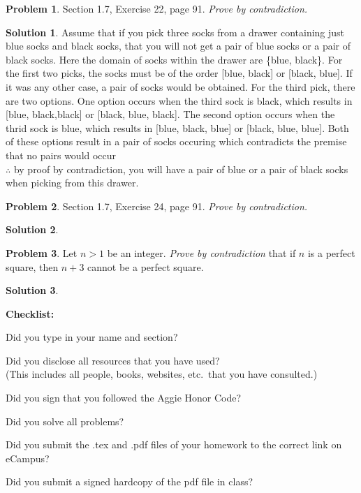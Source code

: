 \documentclass{article}
\theoremstyle{definition}
\newtheorem{problem}{Problem}
\newtheorem*{solution}{Solution}
\newcommand{\checklist}{\noindent\textbf{Checklist:}
\begin{compactitem}[$\Box$] 
\item Did you type in your name and section? 
\item Did you disclose all resources that you have used? \\
(This includes all people, books, websites, etc.\ that you have consulted.)
\item Did you sign that you followed the Aggie Honor Code? 
\item Did you solve all problems? 
\item Did you submit the .tex and .pdf files of your homework to the correct link on eCampus?
\item Did you submit a signed hardcopy of the pdf file in class? 
\end{compactitem}
}
\begin{document}
\begin{problem} Section 1.7, Exercise 22, page 91.  \textsl{Prove by contradiction.}
\end{problem}
\begin{solution}
Assume that if you pick three socks from a drawer containing just blue socks and black socks, that you will not get a pair of blue socks or a pair of black socks. Here the domain of socks within the drawer are \{blue, black\}. For the first two picks, the socks must be of the order [blue, black] or [black, blue]. If it was any other case, a pair of socks would be obtained. For the third pick, there are two options. One option occurs when the third sock is black, which results in [blue, black,black] or [black, blue, black]. The second option occurs when the thrid sock is blue, which results in [blue, black, blue] or [black, blue, blue]. Both of these options result in a pair of socks occuring which contradicts the premise that no pairs would occur \\
$\therefore$ by proof by contradiction, you will have a pair of blue or a pair of black socks when picking from this drawer. 
\end{solution}

\begin{problem} Section 1.7, Exercise 24, page 91.  \textsl{Prove by contradiction.}
\end{problem}
\begin{solution}
\end{solution}

\begin{problem} Let $n>1$ be an integer. \textsl{Prove by contradiction} that 
if $n$ is a perfect square, then $n+3$ cannot be a perfect square. 
\end{problem}
\begin{solution}
\end{solution}

\goodbreak
\checklist
\end{document}
